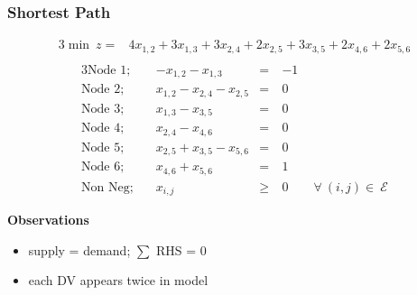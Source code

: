 \documentclass[10pt,handout,notes=show]{beamer}
\begin{document}
\begin{frame}
  \frametitle{Shortest Path  }

  \begin{flushleft} \small{
    \begin{alignat*}{3}
        \min\ z =   & 4x_{1,2} + 3x_{1,3}+  3x_{2,4} +  2x_{2,5} + 3x_{3,5} + 2x_{4,6} + 2x_{5,6} \\
      \end{alignat*}
      \begin{alignat*}{3}
        \mbox{Node 1;~~~}      & -x_{1,2} - x_{1,3}             &=\ &-1 \\
        \mbox{Node 2;~~~}      & x_{1,2} -  x_{2,4} -  x_{2,5}  &=\ &0 \\
        \mbox{Node 3;~~~}      & x_{1,3} - x_{3,5}              &=\ &0 \\
        \mbox{Node 4;~~~}      & x_{2,4} - x_{4,6}              &=\ &0 \\
        \mbox{Node 5;~~~}      & x_{2,5} + x_{3,5} - x_{5,6}    &=\ &0 \\
        \mbox{Node 6;~~~}      & x_{4,6} + x_{5,6}              &=\ &1 \\
        \mbox{Non Neg;~~~}     & x_{i,j} &\geq\ & 0 \qquad  \forall\ (i,j) \in\ \mathcal{E}
      \end{alignat*}
  }
  \end{flushleft}

  \textbf{Observations}
  \begin{itemize}
    \item supply = demand; $\sum$ RHS = 0
    \item each DV appears twice in model
  \end{itemize}

\end{frame}
\end{document}
